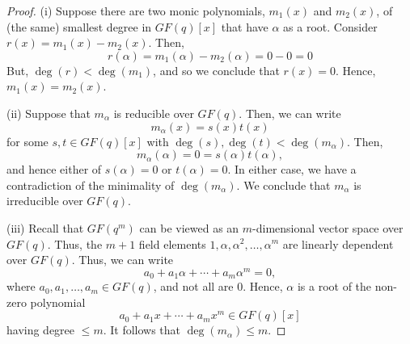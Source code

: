 \begin{proof}
    (i) Suppose there are two monic polynomials, $ m_1(x) $ and $ m_2(x) $,
    of (the same) smallest degree in $ GF(q)[x] $ that have $ \alpha $ as a root. Consider
    $ r(x)=m_1(x)-m_2(x) $. Then,
    \[ r(\alpha)=m_1(\alpha)-m_2(\alpha)=0-0=0 \]
    But, $ \deg(r)<\deg(m_1) $, and so we conclude that $ r(x)=0 $. Hence, $ m_1(x)=m_2(x) $.

    (ii) Suppose that $ m_\alpha $ is reducible over $ GF(q) $. Then, we can write
    \[ m_\alpha(x)=s(x)t(x) \]
    for some $ s,t\in GF(q)[x] $ with $ \deg(s),\deg(t)<\deg(m_\alpha) $. Then,
    \[ m_\alpha(\alpha)=0=s(\alpha)t(\alpha), \]
    and hence either of $ s(\alpha)=0 $ or $ t(\alpha)=0 $. In either case,
    we have a contradiction of the minimality of $ \deg(m_\alpha) $. We conclude
    that $ m_\alpha $ is irreducible over $ GF(q) $.

    (iii) Recall that $ GF(q^m) $ can be viewed as an $ m $-dimensional vector space
    over $ GF(q) $. Thus, the $ m+1 $ field elements $ 1,\alpha,\alpha^2,\ldots ,\alpha^m $
    are linearly dependent over $ GF(q) $. Thus, we can write
    \[ a_0+a_1\alpha+\cdots+a_m\alpha^m=0, \]
    where $ a_0,a_1,\ldots ,a_m\in GF(q) $, and not all are $ 0 $. Hence, $ \alpha $
    is a root of the non-zero polynomial
    \[ a_0+a_1x+\cdots+a_m x^m\in GF(q)[x] \]
    having degree $ \leqslant m $. It follows that $ \deg(m_\alpha) \leqslant m $.
\end{proof}
